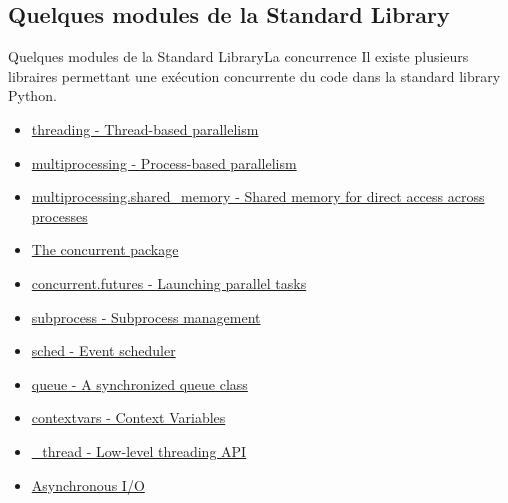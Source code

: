 \documentclass{beamer}
\begin{document}
    \subsection{Quelques modules de la Standard Library}\label{subsec:std-modules}

    \begin{frame}{Quelques modules de la Standard Library}{La concurrence}
        Il existe plusieurs libraires permettant une exécution concurrente du code dans la standard library Python.
        \begin{itemize}
            \item \href{https://docs.python.org/3/library/threading.html}{threading - Thread-based parallelism}
            \item \href{https://docs.python.org/3/library/multiprocessing.html}{multiprocessing - Process-based parallelism}
            \item \href{https://docs.python.org/3/library/multiprocessing.shared_memory.html}{multiprocessing.shared\_memory - Shared memory for direct access across processes}
            \item \href{https://docs.python.org/3/library/concurrent.html}{The concurrent package}
            \item \href{https://docs.python.org/3/library/concurrent.futures.html}{concurrent.futures - Launching parallel tasks}
            \item \href{https://docs.python.org/3/library/subprocess.html}{subprocess - Subprocess management}
            \item \href{https://docs.python.org/3/library/sched.html}{sched - Event scheduler}
            \item \href{https://docs.python.org/3/library/queue.html}{queue - A synchronized queue class}
            \item \href{https://docs.python.org/3/library/contextvars.html}{contextvars - Context Variables}
            \item \href{https://docs.python.org/3/library/\_thread.html}{\_thread - Low-level threading API}
            \item \href{https://docs.python.org/3/library/asyncio.html}{Asynchronous I/O}
        \end{itemize}
    \end{frame}
\end{document}
